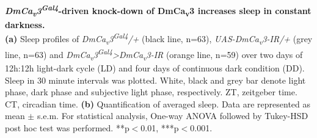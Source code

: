 \label{fig:S3}
\textbf{\emph{DmCa\textsubscript{v}3\textsuperscript{Gal4}}-driven knock-down of DmCa\textsubscript{v}3 increases sleep in constant darkness.}
\\
\textbf{(a)} Sleep profiles of \emph{DmCa\textsubscript{v}3\textsuperscript{Gal4}/+} (black line, n=63), \emph{UAS-DmCa\textsubscript{v}3-IR/+} (grey line, n=63) and \emph{DmCa\textsubscript{v}3\textsuperscript{Gal4}\textgreater{}DmCa\textsubscript{v}3-IR} (orange line, n=59) over two days of 12h:12h light-dark cycle (LD) and four days of continuous dark condition (DD).
Sleep in 30 minute intervals was plotted.
White, black and grey bar denote light phase, dark phase and subjective light phase, respectively.
ZT, zeitgeber time.
CT, circadian time.
\textbf{(b)} Quantification of averaged sleep.
Data are represented as mean $\pm$ s.e.m.
For statistical analysis, One-way ANOVA followed by Tukey-HSD post hoc test was performed.
**p$<$0.01, ***p$<$0.001.
  
  
  
  
  
  
  
  